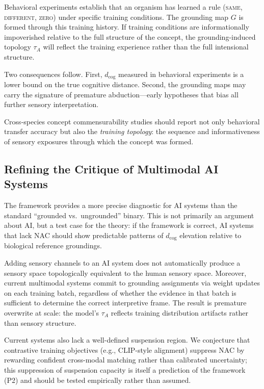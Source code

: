 \documentclass[12pt]{article}
\begin{document}
Behavioral experiments establish that an organism has learned a rule
(\textsc{same}, \textsc{different}, \textsc{zero}) under specific
training conditions.
The grounding map $G$ is formed through this training history.
If training conditions are informationally impoverished relative to
the full structure of the concept, the grounding-induced topology
$\tau_A$ will reflect the training experience rather than the full
intensional structure.

Two consequences follow.
First, $d_\mathrm{cog}$ measured in behavioral experiments is a lower
bound on the true cognitive distance.
Second, the grounding maps may carry the signature of premature
abduction---early hypotheses that bias all further sensory
interpretation.

Cross-species concept commensurability studies should report not only
behavioral transfer accuracy but also the \emph{training topology}:
the sequence and informativeness of sensory exposures through which
the concept was formed.

\subsection{Refining the Critique of Multimodal AI Systems}

The framework provides a more precise diagnostic for AI systems than
the standard ``grounded vs.\ ungrounded'' binary.
This is not primarily an argument about AI, but a test case for the
theory: if the framework is correct, AI systems that lack NAC should
show predictable patterns of $d_\mathrm{cog}$ elevation relative to
biological reference groundings.

Adding sensory channels to an AI system does not automatically produce
a sensory space topologically equivalent to the human sensory space.
Moreover, current multimodal systems commit to grounding assignments
via weight updates on each training batch, regardless of whether the
evidence in that batch is sufficient to determine the correct
interpretive frame.
The result is premature overwrite at scale: the model's $\tau_A$
reflects training distribution artifacts rather than sensory structure.

Current systems also lack a well-defined suspension region.
We conjecture that contrastive training objectives (e.g., CLIP-style
alignment) suppress NAC by rewarding confident cross-modal matching
rather than calibrated uncertainty; this suppression of suspension
capacity is itself a prediction of the framework (P2) and should be
tested empirically rather than assumed.
\end{document}
